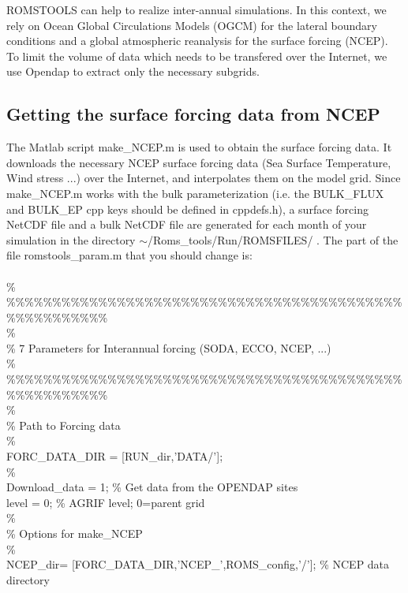 ROMSTOOLS can help to realize inter-annual simulations. In this context, 
we rely on Ocean Global Circulations Models (OGCM) for the lateral 
boundary conditions and a global atmospheric reanalysis for the surface 
forcing (NCEP). To limit the volume of data which needs to be transfered 
over the Internet, we use Opendap to extract only the necessary subgrids. 

\subsection{Getting the surface forcing data from NCEP}

The Matlab script make\_NCEP.m is used to obtain the surface forcing data.
It downloads the necessary NCEP surface forcing data (Sea Surface 
Temperature, Wind stress ...) over the Internet, and interpolates them on 
the model grid. Since make\_NCEP.m works with the bulk parameterization 
(i.e. the 
BULK\_FLUX and BULK\_EP cpp keys should be defined in cppdefs.h),
a surface forcing NetCDF file and a bulk NetCDF file are generated for 
each month of your simulation in the directory 
$\sim$/Roms\_tools/Run/ROMSFILES/ .
The part of the file romstools\_param.m that you should change is:\\\\
\%\\
\%\%\%\%\%\%\%\%\%\%\%\%\%\%\%\%\%\%\%\%\%\%\%\%\%\%\%\%\%\%\%\%\%\%\%\%\%\%\%\%\%\%\%\%\%\%\%\%\%\%\%\%\%\%\\
\%\\
\% 7 Parameters for Interannual forcing (SODA, ECCO, NCEP, ...)\\
\%\\
\%\%\%\%\%\%\%\%\%\%\%\%\%\%\%\%\%\%\%\%\%\%\%\%\%\%\%\%\%\%\%\%\%\%\%\%\%\%\%\%\%\%\%\%\%\%\%\%\%\%\%\%\%\%\\
\%\\
\% Path to Forcing data\\
\%\\
FORC\_DATA\_DIR = [RUN\_dir,'DATA/'];\\
\%\\
Download\_data = 1;                            \% Get data from the OPENDAP sites \\
level         = 0;                            \% AGRIF level; 0=parent grid \\
\%\\
\%  Options for make\_NCEP\\
\%\\
NCEP\_dir= [FORC\_DATA\_DIR,'NCEP\_',ROMS\_config,'/']; \% NCEP data directory\\
